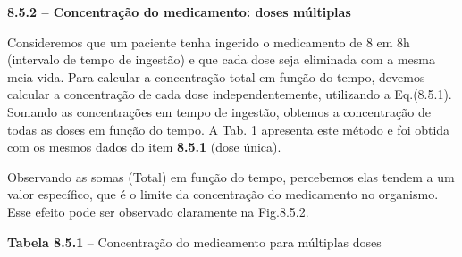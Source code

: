 {\fontsize{14pt}{16.8pt}\selectfont \textbf{8.5.2 – Concentração do medicamento: doses múltiplas}}

Consideremos que um paciente tenha ingerido o medicamento de 8 em 8h (intervalo de tempo de ingestão) e que cada dose seja eliminada com a mesma meia-vida. Para calcular a concentração total em função do tempo, devemos calcular a concentração de cada dose independentemente, utilizando a Eq.(8.5.1). Somando as concentrações em tempo de ingestão, obtemos a concentração de todas as doses em função do tempo. A Tab. 1 apresenta este método e foi obtida com os mesmos dados do item \textbf{8.5.1} (dose única). 

Observando as somas (Total) em função do tempo, percebemos elas tendem a um valor específico, que é o limite da concentração do medicamento no organismo. Esse efeito pode ser observado claramente na Fig.8.5.2.

\textbf{Tabela 8.5.1} – Concentração do medicamento para múltiplas doses

